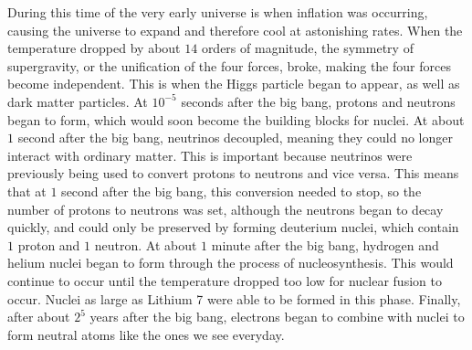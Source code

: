 \documentclass[12pt]{article}
\begin{document}
During this time of the very early universe is when inflation was occurring,
causing the universe to expand and therefore cool at astonishing rates.  When
the temperature dropped by about $14$ orders of magnitude, the symmetry of
supergravity, or the unification of the four forces, broke, making the four
forces become independent.  This is when the Higgs particle began to appear, as
well as dark matter particles. At $10^{-5}$ seconds after the big bang, protons
and neutrons began to form, which would soon become the building blocks for
nuclei.  At about $1$ second after the big bang, neutrinos decoupled, meaning
they could no longer interact with ordinary matter.  This is important because
neutrinos were previously being used to convert protons to neutrons and vice
versa.  This means that at $1$ second after the big bang, this conversion needed
to stop, so the number of protons to neutrons was set, although the neutrons
began to decay quickly, and could only be preserved by forming deuterium
nuclei, which contain $1$ proton and $1$ neutron.  At about $1$ minute after the
big bang, hydrogen and helium nuclei began to form through the process of
nucleosynthesis.  This would continue to occur until the temperature dropped
too low for nuclear fusion to occur.  Nuclei as large as Lithium 7 were able to
be formed in this phase.  Finally, after about $2^{5}$ years after the big
bang, electrons began to combine with nuclei to form neutral atoms like the ones
we see everyday.
\end{document}
